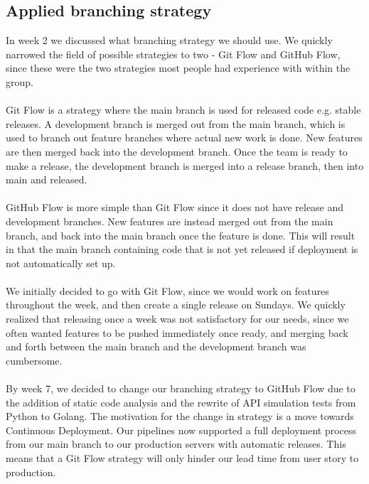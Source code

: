 \subsection{Applied branching strategy}
In week 2 we discussed what branching strategy we should use. We quickly narrowed the field of possible strategies to two - Git Flow and GitHub Flow, since these were the two strategies most people had experience with within the group. 
\\\\
Git Flow is a strategy where the main branch is used for released code e.g. stable releases. A development branch is merged out from the main branch, which is used to branch out feature branches where actual new work is done. New features are then merged back into the development branch. Once the team is ready to make a release, the development branch is merged into a release branch, then into main and released.
\\\\
GitHub Flow is more simple than Git Flow since it does not have release and development branches. New features are instead merged out from the main branch, and back into the main branch once the feature is done. This will result in that the main branch containing code that is not yet released if deployment is not automatically set up.
\\\\
We initially decided to go with Git Flow, since we would work on features throughout the week, and then create a single release on Sundays. We quickly realized that releasing once a week was not satisfactory for our needs, since we often wanted features to be pushed immediately once ready, and merging back and forth between the main branch and the development branch was cumbersome.
\\\\
By week 7, we decided to change our branching strategy to GitHub Flow due to the addition of static code analysis and the rewrite of API simulation tests from Python to Golang. The motivation for the change in strategy is a move towards Continuous Deployment. Our pipelines now supported a full deployment process from our main branch to our production servers with automatic releases. This means that a Git Flow strategy will only hinder our lead time from user story to production.